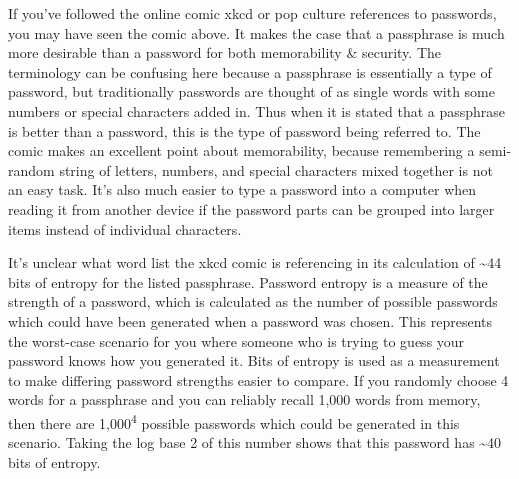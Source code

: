 \documentclass[
	a4paper, %
	10pt, %
	unnumberedsections, %
	twoside, %
]{LTJournalArticle}
\begin{document}
If you've followed the online comic xkcd or pop culture references to passwords, you may have seen the comic above. It makes the case that a passphrase is much more desirable than a password for both memorability \& security. The terminology can be confusing here because a passphrase is essentially a type of password, but traditionally passwords are thought of as single words with some numbers or special characters added in. Thus when it is stated that a passphrase is better than a password, this is the type of password being referred to. The comic makes an excellent point about memorability, because remembering a semi-random string of letters, numbers, and special characters mixed together is not an easy task. It's also much easier to type a password into a computer when reading it from another device if the password parts can be grouped into larger items instead of individual characters.

It's unclear what word list the xkcd comic is referencing in its calculation of \textasciitilde44 bits of entropy for the listed passphrase. Password entropy is a measure of the strength of a password, which is calculated as the number of possible passwords which could have been generated when a password was chosen. This represents the worst-case scenario for you where someone who is trying to guess your password knows how you generated it. Bits of entropy is used as a measurement to make differing password strengths easier to compare. If you randomly choose 4 words for a passphrase and you can reliably recall 1,000 words from memory, then there are 1,000\textsuperscript{4} possible passwords which could be generated in this scenario. Taking the log base 2 of this number shows that this password has \textasciitilde40 bits of entropy.
\end{document}
